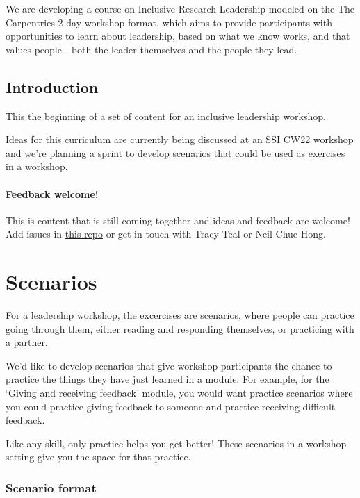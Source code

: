\documentclass[
  letterpaper,
  DIV=11,
  numbers=noendperiod]{scrreprt}
\begin{document}
We are developing a course on Inclusive Research Leadership modeled on
the The Carpentries 2-day workshop format, which aims to provide
participants with opportunities to learn about leadership, based on what
we know works, and that values people - both the leader themselves and
the people they lead.

\hypertarget{introduction}{%
\chapter*{Introduction}\label{introduction}}

This the beginning of a set of content for an inclusive leadership
workshop.

Ideas for this curriculum are currently being discussed at an SSI CW22
workshop and we're planning a sprint to develop scenarios that could be
used as exercises in a workshop.

\hypertarget{feedback-welcome}{%
\subsection*{Feedback welcome!}\label{feedback-welcome}}

This is content that is still coming together and ideas and feedback are
welcome! Add issues in
\href{https://github.com/tracykteal/inclusive-research-leadership}{this
repo} or get in touch with Tracy Teal or Neil Chue Hong.

\part{Scenarios}

For a leadership workshop, the excercises are scenarios, where people
can practice going through them, either reading and responding
themselves, or practicing with a partner.

We'd like to develop scenarios that give workshop participants the
chance to practice the things they have just learned in a module. For
example, for the `Giving and receiving feedback' module, you would want
practice scenarios where you could practice giving feedback to someone
and practice receiving difficult feedback.

Like any skill, only practice helps you get better! These scenarios in a
workshop setting give you the space for that practice.

\hypertarget{scenario-format}{%
\section*{Scenario format}\label{scenario-format}}
\end{document}
